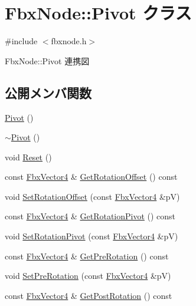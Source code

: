 \hypertarget{class_fbx_node_1_1_pivot}{}\section{Fbx\+Node\+:\+:Pivot クラス}
\label{class_fbx_node_1_1_pivot}


{\ttfamily \#include $<$fbxnode.\+h$>$}



Fbx\+Node\+:\+:Pivot 連携図
\subsection*{公開メンバ関数}
\begin{DoxyCompactItemize}
\item 
\hyperlink{class_fbx_node_1_1_pivot_a1c6a597612cd876db8a767826aa06f44}{Pivot} ()
\item 
\hyperlink{class_fbx_node_1_1_pivot_a7eab88240f0f17103157caa8e6b8500a}{$\sim$\+Pivot} ()
\item 
void \hyperlink{class_fbx_node_1_1_pivot_a7282010ee140c753e6f8fdaf014d9c8d}{Reset} ()
\item 
const \hyperlink{class_fbx_vector4}{Fbx\+Vector4} \& \hyperlink{class_fbx_node_1_1_pivot_ac2d8f3d1768f9e52e7ae096c15d2dcb6}{Get\+Rotation\+Offset} () const
\item 
void \hyperlink{class_fbx_node_1_1_pivot_a172c221e2a3ea853ff1e3daeb55c05e7}{Set\+Rotation\+Offset} (const \hyperlink{class_fbx_vector4}{Fbx\+Vector4} \&pV)
\item 
const \hyperlink{class_fbx_vector4}{Fbx\+Vector4} \& \hyperlink{class_fbx_node_1_1_pivot_af2640c863b393ec2540100d414ce8127}{Get\+Rotation\+Pivot} () const
\item 
void \hyperlink{class_fbx_node_1_1_pivot_abbfb38995a341d1a533fe49ea6954d5f}{Set\+Rotation\+Pivot} (const \hyperlink{class_fbx_vector4}{Fbx\+Vector4} \&pV)
\item 
const \hyperlink{class_fbx_vector4}{Fbx\+Vector4} \& \hyperlink{class_fbx_node_1_1_pivot_aeb33eb1d8182c36b1477016e0a1aad5a}{Get\+Pre\+Rotation} () const
\item 
void \hyperlink{class_fbx_node_1_1_pivot_a740d4c2bf9c3e56d067028b255ea3e8d}{Set\+Pre\+Rotation} (const \hyperlink{class_fbx_vector4}{Fbx\+Vector4} \&pV)
\item 
const \hyperlink{class_fbx_vector4}{Fbx\+Vector4} \& \hyperlink{class_fbx_node_1_1_pivot_aa3feddac1bf3ac072754b9135142278f}{Get\+Post\+Rotation} () const
\item 

\end{DoxyCompactItemize}
